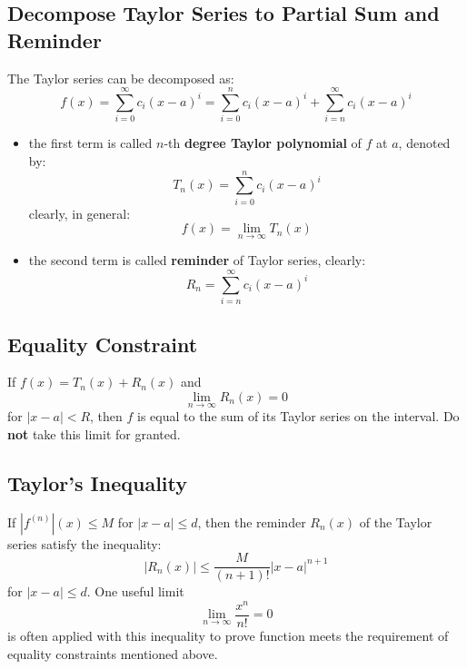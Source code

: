 \documentclass[10pt,a4paper,oneside]{article}
\begin{document}
\subsection{Decompose Taylor Series to Partial Sum and Reminder}
The Taylor series can be decomposed as:
\[
f(x) = \sum_{i=0}^{\infty} c_i (x-a)^i = \sum_{i=0}^{n} c_i (x-a)^i  +  \sum_{i=n}^{\infty} c_i (x-a)^i 
\]
\begin{itemize}
	\item the first term is called $n$-th \textbf{degree Taylor polynomial} of $f$ at $a$, denoted by:
	\[
	T_n(x) = \sum_{i=0}^{n} c_i (x-a)^i 
	\]
	clearly, in general:
	\[
	f(x) = \lim\limits_{n \rightarrow \infty} T_n(x)
	\]
	\item the second term is called \textbf{reminder} of Taylor series, clearly:
	\[
	R_n = \sum_{i=n}^{\infty} c_i (x-a)^i 
	\]
\end{itemize}

\subsection{Equality Constraint}
If $f(x) = T_n(x) + R_n(x)$ and
\[
\lim_{n \rightarrow \infty} R_n(x) = 0
\]
for $|x-a|<R$, then $f$ is equal to the sum of its Taylor series on the interval. Do \textbf{not} take this limit for granted.

\subsection{Taylor's Inequality}
If $|f^{(n)}|(x) \leq M$ for $|x-a|\leq d$, then the reminder $R_n(x)$ of the Taylor series satisfy the inequality:
\[
|R_n(x)| \leq \frac{M}{(n+1)!} |x-a|^{n+1}
\]
for $|x-a|\leq d$. One useful limit
\[
\lim_{n \rightarrow \infty} \frac{x^n}{n!} = 0
\]
is often applied with this inequality to prove function meets the requirement of equality constraints mentioned above.
\end{document}
